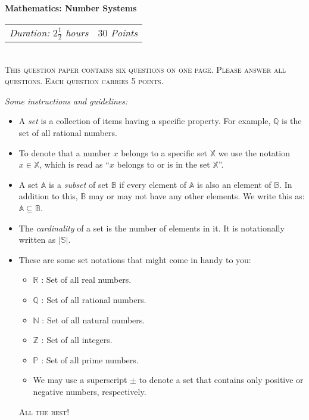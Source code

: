 \documentclass[8pt,a4paper]{extarticle}
\begin{document}
\begin{center}
\large{\textbf{Mathematics: Number Systems}}
\end{center}


\begin{tabular}{p{8cm}r}
\textit{Duration: $2\frac{1}{2}$ hours} & \textit{$30$ Points}
\end{tabular}\\

\textsc{ This question paper contains six questions on one page. Please answer all questions. Each question carries 5 points.}

\textit{Some instructions and guidelines:}
\begin{itemize}
\item A \textit{set} is a collection of items having a specific property. For example, $\mathbb{Q}$ is the set of all rational numbers. 
\item To denote that a number $x$ belongs to a specific set $\mathbb{X}$ we use the notation $x \in \mathbb{X}$, which is read as ``$x$ belongs to or is in the set $\mathbb{X}$''.
\item A set $\mathbb{A}$ is a \textit{subset} of set $\mathbb{B}$ if every element of $\mathbb{A}$ is also an element of $\mathbb{B}$. In addition to this, $\mathbb{B}$  may or may not have any other elements. We write this as: $\mathbb{A} \subseteq \mathbb{B}$.
\item The \textit{cardinality} of a set is the number of elements in it. It is notationally written as $\left\vert{\mathbb{S}}\right\vert$.
\item These are some set notations that might come in handy to you:
\begin{itemize}
\item $\mathbb{R}$ : Set of all real numbers.
\item $\mathbb{Q}$ : Set of all rational numbers.
\item $\mathbb{N}$ : Set of all natural numbers.
\item $\mathbb{Z}$ : Set of all integers.
\item $\mathbb{P}$ : Set of all prime numbers.
\item We may use a superscript $\pm$ to denote a set that contains only positive or negative numbers, respectively.
\end{itemize}
\begin{center}
\textsc{All the best!}
\end{center}
\end{itemize}
\end{document}
